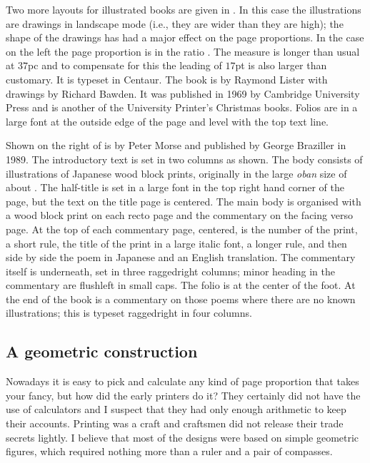 \documentclass[10pt,letterpaper,extrafontsizes]{memoir}
\begin{document}
    Two more layouts for illustrated books are given in .
In this case the illustrations are drawings in landscape 
mode (i.e., they are wider than they are high); the shape of the drawings 
has had a major effect on the page proportions. In the case on the left 
the page proportion is in the ratio . The measure is 
longer than usual at $37$pc and to compensate for this the leading of $17$pt 
is also larger than customary. It is typeset in Centaur.
The book is
 by Raymond Lister with drawings by Richard Bawden.
It was published in 1969 by Cambridge University 
Press and is another of
the University Printer's Christmas books. Folios
are in a large font at the outside edge of the page and level with the 
top text line.


Shown on the right of  is 
by Peter Morse and published by George Braziller in 1989. The introductory
text is set in two columns as shown. The body consists 
of illustrations of Japanese wood block prints, 
originally in the large \textit{oban} size of about .
The half-title 
is set in a large font in the top
right hand corner of the page, but the text on the title
page is centered. The main body is organised with a wood block print
on each recto page and the commentary on the facing verso page. At the
top of each commentary page, centered, is the number of the print, a short
rule, the title of the print in a large italic font, a longer rule,
and then side by side the poem in Japanese and an English translation.
The commentary itself is underneath, set in three raggedright 
columns; minor heading in the commentary are
flushleft in small caps. The folio is at the center
of the foot. At the end of the book is a commentary on
those poems where there are no known illustrations; this is typeset
raggedright in four columns.


\subsection{A geometric construction} \label{sec:gutenbergpage}

    Nowadays it is easy to pick and calculate any kind of page proportion
that takes your fancy, but how did the early printers do it? They certainly
did not have the use of calculators and I suspect that they had only enough
arithmetic to keep their accounts. Printing was a craft and craftsmen did
not release their trade secrets lightly. I believe that most of the designs
were based on simple geometric figures, which required nothing more than
a ruler and a pair of compasses.
\end{document}
